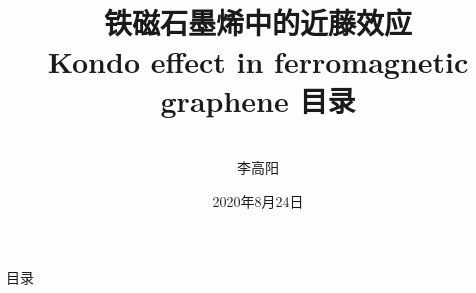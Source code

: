 \documentclass[9pt,t]{beamer} %
\title[交叉学科中心]{\ \\ \ \\ 
铁磁石墨烯中的近藤效应\\ 
\Large{Kondo effect in ferromagnetic graphene}
}
\author[李高阳]{
\ \\ 
李高阳}
\date{2020年8月24日}
\begin{document}
\begin{frame}[plain,t]
\normalsize
\titlepage
\end{frame}
\addtocounter{framenumber}{-1}  %
\title{目录}
\begin{frame}{目录}
\tableofcontents
\end{frame}
\end{document}
